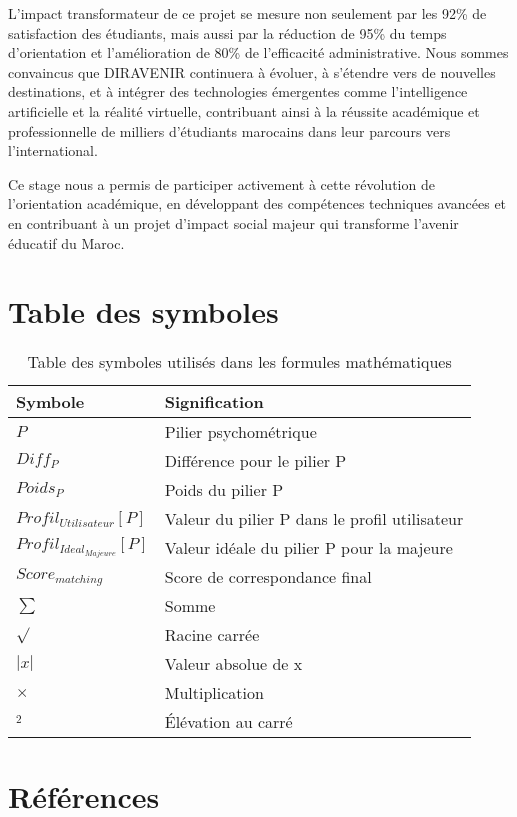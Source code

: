 \documentclass[12pt,a4paper]{report}
\begin{document}
L'impact transformateur de ce projet se mesure non seulement par les 92\% de satisfaction des étudiants, mais aussi par la réduction de 95\% du temps d'orientation et l'amélioration de 80\% de l'efficacité administrative. Nous sommes convaincus que DIRAVENIR continuera à évoluer, à s'étendre vers de nouvelles destinations, et à intégrer des technologies émergentes comme l'intelligence artificielle et la réalité virtuelle, contribuant ainsi à la réussite académique et professionnelle de milliers d'étudiants marocains dans leur parcours vers l'international.

Ce stage nous a permis de participer activement à cette révolution de l'orientation académique, en développant des compétences techniques avancées et en contribuant à un projet d'impact social majeur qui transforme l'avenir éducatif du Maroc.

\chapter*{Table des symboles}

\begin{table}[H]
\centering
\begin{tabular}{@{}ll@{}}
\toprule
\textbf{Symbole} & \textbf{Signification} \\
\midrule
$P$ & Pilier psychométrique \\
$Diff_P$ & Différence pour le pilier P \\
$Poids_P$ & Poids du pilier P \\
$Profil_{Utilisateur}[P]$ & Valeur du pilier P dans le profil utilisateur \\
$Profil_{Ideal_{Majeure}}[P]$ & Valeur idéale du pilier P pour la majeure \\
$Score_{matching}$ & Score de correspondance final \\
$\sum$ & Somme \\
$\sqrt{}$ & Racine carrée \\
$|x|$ & Valeur absolue de x \\
$\times$ & Multiplication \\
$^2$ & Élévation au carré \\
\bottomrule
\end{tabular}
\caption{Table des symboles utilisés dans les formules mathématiques}
\label{tab:symboles}
\end{table}

\chapter*{Références}
\end{document}
